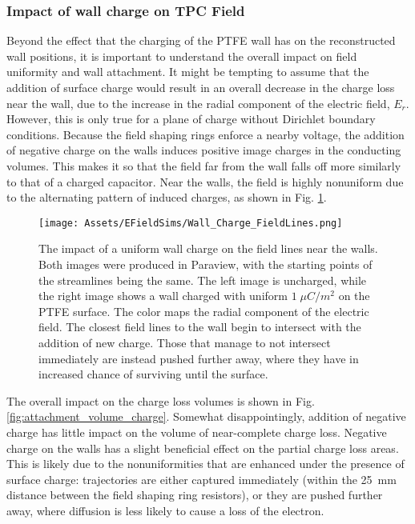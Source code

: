 \subsubsection{Impact of wall charge on TPC Field}

Beyond the effect that the charging of the PTFE wall has on the reconstructed wall positions, it is important to understand the overall impact on field uniformity and wall attachment.
It might be tempting to assume that the addition of surface charge would result in an overall decrease in the charge loss near the wall, due to the increase in the radial component of the electric field, $E_r$.
However, this is only true for a plane of charge without Dirichlet boundary conditions.
Because the field shaping rings enforce a nearby voltage, the addition of negative charge on the walls induces positive image charges in the conducting volumes.
This makes it so that the field far from the wall falls off more similarly to that of a charged capacitor.
Near the walls, the field is highly nonuniform due to the alternating pattern of induced charges, as shown in Fig. \ref{fig:wall_field_lines}.

\begin{figure}
    \centering
    \texttt{[image: Assets/EFieldSims/Wall\_Charge\_FieldLines.png]}
    \caption[The impact of a uniform wall charge on the field lines near the walls. ]%
    {The impact of a uniform wall charge on the field lines near the walls. 
    Both images were produced in Paraview, with the starting points of the streamlines being the same.
    The left image is uncharged, while the right image shows a wall charged with uniform $1\;\mu C/m^2$ on the PTFE surface.
    The color maps the radial component of the electric field.
    The closest field lines to the wall begin to intersect with the addition of new charge.
    Those that manage to not intersect immediately are instead pushed further away, where they have in increased chance of surviving until the surface.
    }
    \label{fig:wall_field_lines}
\end{figure}

The overall impact on the charge loss volumes is shown in Fig. \ref{fig:attachment_volume_charge}.
Somewhat disappointingly, addition of negative charge has little impact on the volume of near-complete charge loss.
Negative charge on the walls has a slight beneficial effect on the partial charge loss areas. 
This is likely due to the nonuniformities that are enhanced under the presence of surface charge: trajectories are either captured immediately (within the 25~mm distance between the  field shaping ring resistors), or they are pushed further away, where diffusion is less likely to cause a loss of the electron.


